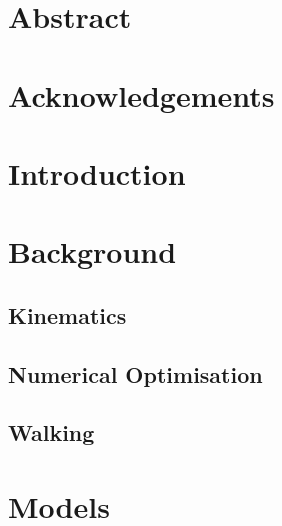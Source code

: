 \documentclass{UoNMCHA}
\begin{document}
	

	\vspace{-5mm}
	\section*{Abstract}
	\vspace{-3mm}
		

	\vspace{-2mm}
	\section*{Acknowledgements}
	\vspace{-3mm}
		

	\newpage\tableofcontents
	
	\newpage\listoffigures\listoftables\listofalgorithms
	
	
	\newpage\section{Introduction}
		

	\clearpage
	\newpage\section{Background}\label{sec:Background}
		
		\subsection{Kinematics}
			
		\subsection{Numerical Optimisation}
			
		\subsection{Walking}
			
	
	\clearpage
	\newpage\section{Models}\label{sec:Models}
		
\end{document}

